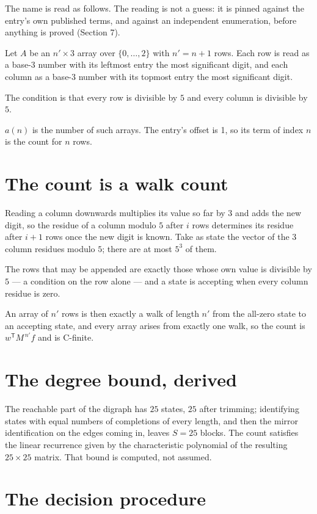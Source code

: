 \documentclass[11pt]{article}
\theoremstyle{definition}
\begin{document}
The name is read as follows. The reading is not a guess: it is pinned against the entry's own published terms, and against an independent enumeration, before anything is proved (Section 7).

Let $A$ be an $n' \times 3$ array over $\{0,\dots,2\}$ with $n' = n + 1$ rows. Each row is read as a base-$3$ number with its leftmost entry the most significant digit, and each column as a base-$3$ number with its topmost entry the most significant digit.

The condition is that every row is divisible by $5$ and every column is divisible by $5$.

$a(n)$ is the number of such arrays. The entry's offset is 1, so its term of index $n$ is the count for $n$ rows.

\section{The count is a walk count}

Reading a column downwards multiplies its value so far by $3$ and adds the new digit, so the residue of a column modulo $5$ after $i$ rows determines its residue after $i+1$ rows once the new digit is known. Take as state the vector of the $3$ column residues modulo $5$; there are at most $5^{3}$ of them.

The rows that may be appended are exactly those whose own value is divisible by $5$ --- a condition on the row alone --- and a state is accepting when every column residue is zero.

An array of $n'$ rows is then exactly a walk of length $n'$ from the all-zero state to an accepting state, and every array arises from exactly one walk, so the count is $w^{\mathsf T}M^{\,n'}f$ and is C-finite.

\section{The degree bound, derived}

The reachable part of the digraph has $25$ states, $25$ after trimming; identifying states with equal numbers of completions of every length, and then the mirror identification on the edges coming in, leaves $S = 25$ blocks. The count satisfies the linear recurrence given by the characteristic polynomial of the resulting $25\times25$ matrix. That bound is computed, not assumed.

\section{The decision procedure}
\end{document}
